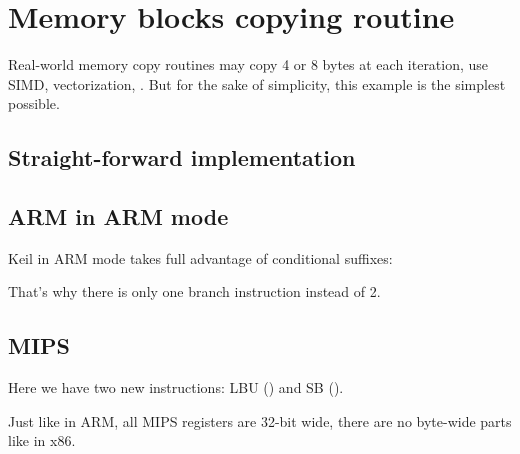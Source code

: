 ﻿\section{Memory blocks copying routine}
\label{loop_memcpy}

Real-world memory copy routines may copy 4 or 8 bytes at each iteration, use \ac{SIMD}, 
vectorization, \etc{}.
But for the sake of simplicity, this example is the simplest possible.



\subsection{Straight-forward implementation}



\ifdefined\IncludeARM





\subsection{ARM in ARM mode}

Keil in ARM mode takes full advantage of conditional suffixes:



That's why there is only one branch instruction instead of 2.

\fi

\ifdefined\IncludeMIPS
\subsection{MIPS}




Here we have two new instructions: LBU () and SB ().

Just like in ARM, all MIPS registers are 32-bit wide, there are no byte-wide parts like in x86.

